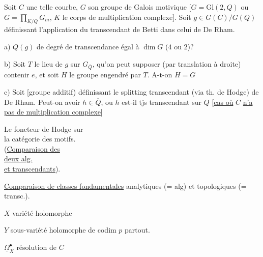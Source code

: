 Soit $C$ une telle courbe, $G$ son groupe de Galois motivique [$G=\mathrm{Gl}(2,Q)$ ou $G=\prod_{K/Q}G_m$, $K$ le corps de multiplication complexe]. Soit $g\in G(C)/G(Q)$ définissant l'application du  transcendant de Betti dans celui de De Rham.

a) $Q(g)$ de degré de transcendance égal à $\dim G$ ($4$ ou $2$)?

b) Soit $T$ le lieu de $g$ sur $G_{\overline Q}$,  qu'on peut supposer (par translation à droite) contenir $e$, et soit $H$ le groupe engendré  par $T$. 
A-t-on $H=G$

c) Soit   [groupe additif) définissant le splitting transcendant (via th. de Hodge) de De Rham. Peut-on avoir $h\in\overline Q$, ou $h$ est-il tjs transcendant sur $Q$ [\uline{cas où} $C$ \uline{n'a pas de multiplication complexe}]

Le foncteur de Hodge sur\\
la catégorie des motifs.\\
(\uline{Comparaison des}\\
\uline{deux  alg.}\\
\uline{et transcendants}).

\uline{Comparaison de classes fondamentales} analytiques (= alg) et topologiques (= transc.).

$X$ variété  holomorphe

$Y$ sous-variété holomorphe de codim $p$ partout.

$\underline\Omega_X^\bullet$ résolution de $C$

